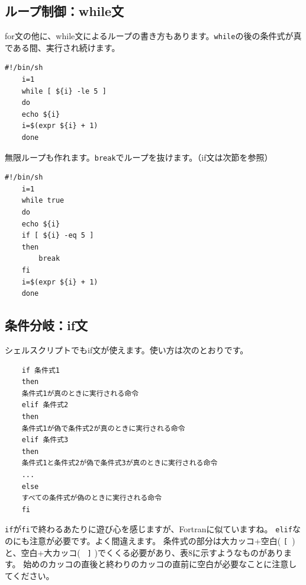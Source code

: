 \documentclass[a4j]{ltjsreport}
\begin{document}
    \subsection{ループ制御：while文}
    for文の他に、while文によるループの書き方もあります。\texttt{while}の後の条件式が真である間、実行され続けます。
    \begin{lstlisting}[caption=sample07.sh 改4]
    #!/bin/sh
    i=1
    while [ ${i} -le 5 ]
    do
    echo ${i}
    i=$(expr ${i} + 1)
    done
    \end{lstlisting}
    無限ループも作れます。\texttt{break}でループを抜けます。（if文は次節を参照）
    \begin{lstlisting}[caption=sample07.sh 改5]
    #!/bin/sh
    i=1
    while true
    do
    echo ${i}
    if [ ${i} -eq 5 ]
    then
        break
    fi
    i=$(expr ${i} + 1)
    done
    \end{lstlisting}
    
    \subsection{条件分岐：if文}

    シェルスクリプトでもif文が使えます。使い方は次のとおりです。
    \begin{lstlisting}
    if 条件式1
    then
    条件式1が真のときに実行される命令
    elif 条件式2
    then
    条件式1が偽で条件式2が真のときに実行される命令
    elif 条件式3
    then
    条件式1と条件式2が偽で条件式3が真のときに実行される命令
    ...
    else
    すべての条件式が偽のときに実行される命令
    fi
    \end{lstlisting}
    \texttt{if}が\texttt{fi}で終わるあたりに遊び心を感じますが、Fortranに似ていますね。
    \texttt{elif}なのにも注意が必要です。よく間違えます。
    条件式の部分は大カッコ+空白( \verb*|[ |)と、空白+大カッコ( \verb*| ]| )でくくる必要があり、表8に示すようなものがあります。
    始めのカッコの直後と終わりのカッコの直前に空白が必要なことに注意してください。
\end{document}
